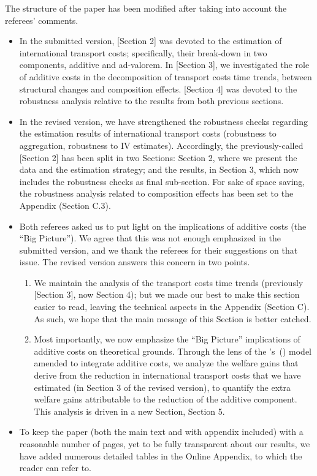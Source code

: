 \documentclass[a4paper,11pt]{article}
\newcommand\cites[1]{\citeauthor{#1}'s\ (\citeyear{#1})}
\begin{document}
The structure of the paper has been modified after taking into account the referees' comments.
\begin{itemize}
\item In the submitted version, [Section 2] was devoted to the estimation of international transport costs; specifically, their break-down in two components, additive and ad-valorem. In [Section 3], we investigated the role of additive costs in the decomposition of transport costs time trends, between structural changes and composition effects. [Section 4] was devoted to the robustness analysis relative to the results from both previous sections.
\item In the revised version, we have strengthened the robustness checks regarding the estimation results of international transport costs (robustness to aggregation, robustness to IV estimates). Accordingly, the previously-called [Section 2] has been split in two Sections: Section 2, where we present the data and the estimation strategy; and the results, in Section 3, which now includes the robustness checks as final sub-section. For sake of space saving, the robustness analysis related to composition effects has been set to the Appendix (Section C.3).
\item Both referees asked us to put light on the implications of additive costs (the ``Big Picture''). We agree that this was not enough emphasized in the submitted version, and we thank the referees for their suggestions on that issue. The revised version answers this concern in two points.
    \begin{enumerate}
    \item We maintain the analysis of the transport costs time trends (previously [Section 3], now Section 4); but we made our best to make this section easier to read, leaving the technical aspects in the Appendix (Section C). As such, we hope that the main message of this Section is better catched.
    \item Most importantly, we now emphasize the ``Big Picture'' implications of additive costs on theoretical grounds. Through the lens of the \cites{melitz} model amended to integrate additive costs, we analyze the welfare gains that derive from the reduction in international transport costs that we have estimated (in Section 3 of the revised version), to quantify the extra welfare gains attributable to the reduction of the additive component. This analysis is driven in a new Section, Section 5.
        \end{enumerate}
\item To keep the paper (both the main text and with appendix included) with a reasonable number of pages, yet to be fully transparent about our results, we have added numerous detailed tables in the Online Appendix, to which the reader can refer to.
\end{itemize}
\end{document}
